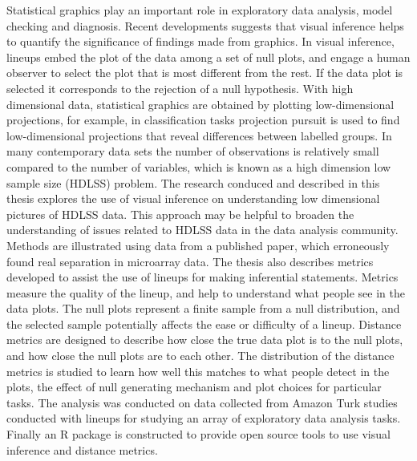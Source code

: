 
Statistical graphics play an important role in exploratory data analysis, model checking and diagnosis. Recent developments suggests that visual inference helps to quantify the significance of findings made from graphics.  In visual inference, lineups embed the plot of the data among a set of null plots, and engage a human observer to select the plot that is most different from the rest. If the data plot is selected it corresponds to the rejection of a null hypothesis. With high dimensional data, statistical graphics are obtained by plotting low-dimensional projections, for example, in classification tasks projection pursuit is used to find low-dimensional projections that reveal differences between labelled groups. In many contemporary data sets the number of observations is relatively small compared to the number of variables, which is known as a high dimension low sample size (HDLSS) problem. The research conduced and described in this thesis explores the use of visual inference on understanding low dimensional pictures of HDLSS data. This approach may be helpful to broaden the understanding of issues related to HDLSS data in the data analysis community. Methods are illustrated using data from a published paper, which erroneously found real separation in microarray data. The thesis also describes metrics developed to assist the use of lineups for making inferential statements.  Metrics  measure the quality of the lineup, and help to understand what people see in the data plots.  The null plots represent a finite sample from a null distribution, and the selected sample potentially affects the ease or difficulty of a lineup. Distance metrics are designed to describe how close the true data plot is to the null plots, and how close the null plots are to each other. The distribution of the distance metrics is studied to learn how well this matches to what people detect in the plots, the effect of null generating mechanism and plot choices for particular tasks.  The analysis was conducted on data collected from Amazon Turk studies conducted with lineups for studying an array of exploratory data analysis tasks. Finally an R package is constructed to provide open source tools to use visual inference and distance metrics.

